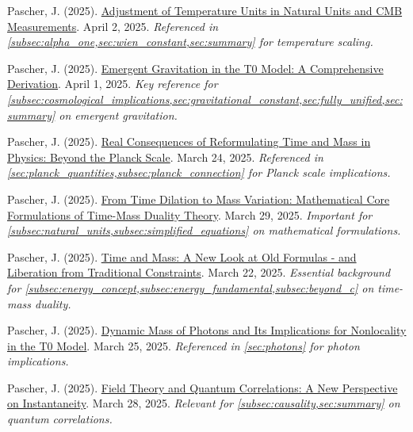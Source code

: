 \documentclass[12pt,a4paper]{article}
\begin{document}
\begin{thebibliography}{99}
		 Pascher, J. (2025). \href{https://github.com/jpascher/T0-Time-Mass-Duality/tree/main/2/pdf/English/TempEinheitenCMBEn.pdf}{Adjustment of Temperature Units in Natural Units and CMB Measurements}. April 2, 2025. \textit{Referenced in \cref{subsec:alpha_one,sec:wien_constant,sec:summary} for temperature scaling.}
		
		 Pascher, J. (2025). \href{https://github.com/jpascher/T0-Time-Mass-Duality/tree/main/2/pdf/English/EmergentGravT0En.pdf}{Emergent Gravitation in the T0 Model: A Comprehensive Derivation}. April 1, 2025. \textit{Key reference for \cref{subsec:cosmological_implications,sec:gravitational_constant,sec:fully_unified,sec:summary} on emergent gravitation.}
		
		 Pascher, J. (2025). \href{https://github.com/jpascher/T0-Time-Mass-Duality/tree/main/2/pdf/English/JenseitsPlanckEn.pdf}{Real Consequences of Reformulating Time and Mass in Physics: Beyond the Planck Scale}. March 24, 2025. \textit{Referenced in \cref{sec:planck_quantities,subsec:planck_connection} for Planck scale implications.}
		
		 Pascher, J. (2025). \href{https://github.com/jpascher/T0-Time-Mass-Duality/tree/main/2/pdf/English/MathZeitMasseLagrangeEn.pdf}{From Time Dilation to Mass Variation: Mathematical Core Formulations of Time-Mass Duality Theory}. March 29, 2025. \textit{Important for \cref{subsec:natural_units,subsec:simplified_equations} on mathematical formulations.}
		
		 Pascher, J. (2025). \href{https://github.com/jpascher/T0-Time-Mass-Duality/tree/main/2/pdf/English/ZeitMasseNeuerBlickEn.pdf}{Time and Mass: A New Look at Old Formulas - and Liberation from Traditional Constraints}. March 22, 2025. \textit{Essential background for \cref{subsec:energy_concept,subsec:energy_fundamental,subsec:beyond_c} on time-mass duality.}
		
		 Pascher, J. (2025). \href{https://github.com/jpascher/T0-Time-Mass-Duality/tree/main/2/pdf/English/DynMassePhotonenNichtlokalEn.pdf}{Dynamic Mass of Photons and Its Implications for Nonlocality in the T0 Model}. March 25, 2025. \textit{Referenced in \cref{sec:photons} for photon implications.}
		
		 Pascher, J. (2025). \href{https://github.com/jpascher/T0-Time-Mass-Duality/tree/main/2/pdf/English/FeldtheorieQuantenEn.pdf}{Field Theory and Quantum Correlations: A New Perspective on Instantaneity}. March 28, 2025. \textit{Relevant for \cref{subsec:causality,sec:summary} on quantum correlations.}
		

\end{thebibliography}
\end{document}
